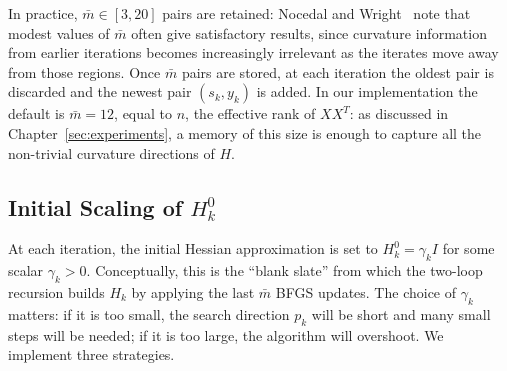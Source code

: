 \noindent In practice, $\bar{m} \in [3, 20]$ pairs are retained: Nocedal and
Wright~\cite[Section~9.1]{nocedal2006numerical} note that modest values of
$\bar{m}$ often give satisfactory results, since curvature information from
earlier iterations becomes increasingly irrelevant as the iterates move away from
those regions. Once $\bar{m}$ pairs are stored, at each iteration the oldest
pair is discarded and the newest pair $(s_k, y_k)$ is added.
In our implementation the default is $\bar{m} = 12$, equal to $n$, the
effective rank of $XX^T$: as discussed in Chapter~\ref{sec:experiments}, a
memory of this size is enough to capture all the non-trivial curvature
directions of $H$.


\subsection{Initial Scaling of \texorpdfstring{$H_k^0$}{H0}}
\label{sec:h0_scaling}

\noindent At each iteration, the initial Hessian approximation is set to
$H_k^0 = \gamma_k I$ for some scalar $\gamma_k > 0$. Conceptually, this is the
``blank slate'' from which the two-loop recursion builds $H_k$ by applying the
last $\bar{m}$ BFGS updates. The choice of $\gamma_k$ matters: if it is too
small, the search direction $p_k$ will be short and many small steps will be
needed; if it is too large, the algorithm will overshoot. We implement three
strategies.



